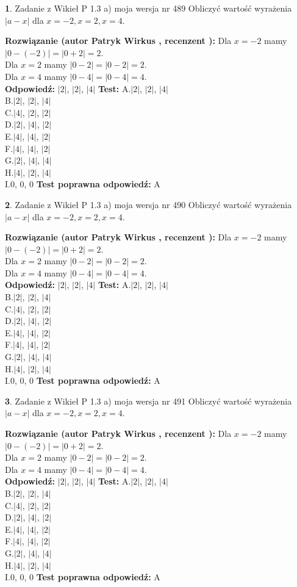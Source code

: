 \documentclass[12pt, a4paper]{article}
\theoremstyle{definition} %
\newtheorem{zad}{}
\newcommand{\zadStart}[1]{\begin{zad}#1\newline}
\newcommand{\zadStop}{\end{zad}}
\newcommand{\rozwStart}[2]{\noindent \textbf{Rozwiązanie (autor #1 , recenzent #2): }\newline}
\newcommand{\rozwStop}{\newline}
\newcommand{\odpStart}{\noindent \textbf{Odpowiedź:}\newline}
\newcommand{\odpStop}{\newline}
\newcommand{\testStart}{\noindent \textbf{Test:}\newline}
\newcommand{\testStop}{\newline}
\newcommand{\kluczStart}{\noindent \textbf{Test poprawna odpowiedź:}\newline}
\newcommand{\kluczStop}{\newline}
\begin{document}
\zadStart{Zadanie z Wikieł P 1.3 a) moja wersja nr 489}
Obliczyć wartość wyrażenia $|a - x|$ dla $x=-2,x=2,x=4$.
\zadStop
\rozwStart{Patryk Wirkus}{}
Dla $x = -2$ mamy $|0 - (-2)| = |0 + 2| = 2$.\\
Dla $x = 2$ mamy $|0 - 2| = |0 - 2| = 2$.\\
Dla $x = 4$ mamy $|0 - 4| = |0 - 4| = 4$.\\
\rozwStop
\odpStart
$|2|$, $|2|$, $|4|$
\odpStop
\testStart
A.$|2|$, $|2|$, $|4|$\\
B.$|2|$, $|2|$, $|4|$\\
C.$|4|$, $|2|$, $|2|$\\
D.$|2|$, $|4|$, $|2|$\\
E.$|4|$, $|4|$, $|2|$\\
F.$|4|$, $|4|$, $|2|$\\
G.$|2|$, $|4|$, $|4|$\\
H.$|4|$, $|2|$, $|4|$\\
I.$0$, $0$, $0$
\testStop
\kluczStart
A
\kluczStop



\zadStart{Zadanie z Wikieł P 1.3 a) moja wersja nr 490}
Obliczyć wartość wyrażenia $|a - x|$ dla $x=-2,x=2,x=4$.
\zadStop
\rozwStart{Patryk Wirkus}{}
Dla $x = -2$ mamy $|0 - (-2)| = |0 + 2| = 2$.\\
Dla $x = 2$ mamy $|0 - 2| = |0 - 2| = 2$.\\
Dla $x = 4$ mamy $|0 - 4| = |0 - 4| = 4$.\\
\rozwStop
\odpStart
$|2|$, $|2|$, $|4|$
\odpStop
\testStart
A.$|2|$, $|2|$, $|4|$\\
B.$|2|$, $|2|$, $|4|$\\
C.$|4|$, $|2|$, $|2|$\\
D.$|2|$, $|4|$, $|2|$\\
E.$|4|$, $|4|$, $|2|$\\
F.$|4|$, $|4|$, $|2|$\\
G.$|2|$, $|4|$, $|4|$\\
H.$|4|$, $|2|$, $|4|$\\
I.$0$, $0$, $0$
\testStop
\kluczStart
A
\kluczStop



\zadStart{Zadanie z Wikieł P 1.3 a) moja wersja nr 491}
Obliczyć wartość wyrażenia $|a - x|$ dla $x=-2,x=2,x=4$.
\zadStop
\rozwStart{Patryk Wirkus}{}
Dla $x = -2$ mamy $|0 - (-2)| = |0 + 2| = 2$.\\
Dla $x = 2$ mamy $|0 - 2| = |0 - 2| = 2$.\\
Dla $x = 4$ mamy $|0 - 4| = |0 - 4| = 4$.\\
\rozwStop
\odpStart
$|2|$, $|2|$, $|4|$
\odpStop
\testStart
A.$|2|$, $|2|$, $|4|$\\
B.$|2|$, $|2|$, $|4|$\\
C.$|4|$, $|2|$, $|2|$\\
D.$|2|$, $|4|$, $|2|$\\
E.$|4|$, $|4|$, $|2|$\\
F.$|4|$, $|4|$, $|2|$\\
G.$|2|$, $|4|$, $|4|$\\
H.$|4|$, $|2|$, $|4|$\\
I.$0$, $0$, $0$
\testStop
\kluczStart
A
\kluczStop
\end{document}
